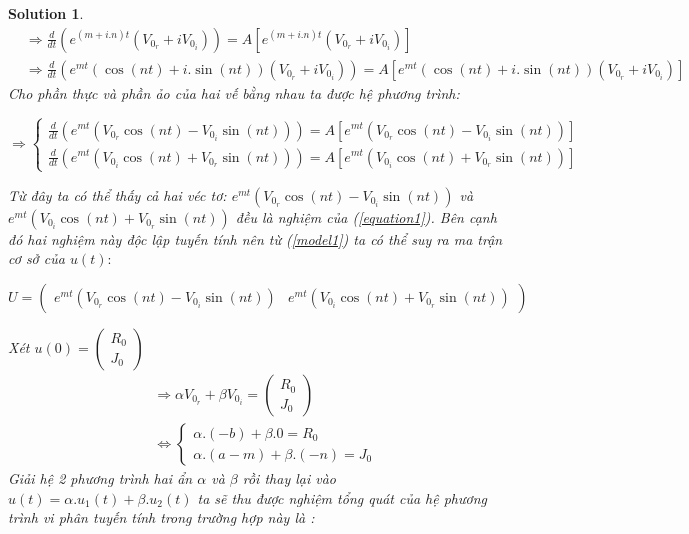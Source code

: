 \documentclass[a4paper]{article}
\newtheorem*{sol}{Solution}
\begin{document}
\begin{sol}
\begin{align*}
    &\Rightarrow \frac{d}{dt}(e^{(m+i.n)t}(V_{0_r}  + iV_{0_i} ))=A\left [e^{(m+i.n)t}(V_{0_r}  + iV_{0_i})\right]\\
&\Rightarrow \frac{d}{dt}(e^{mt}(\cos(nt)+i.\sin(nt))(V_{0_r}  + iV_{0_i} ))=A \left[ e^{mt}(\cos(nt)+i.\sin(nt))(V_{0_r}  + iV_{0_i} )\right ]
\end{align*}
Cho phần thực và phần ảo của hai vế bằng nhau ta được hệ phương trình:
\begin{center}
    $\Rightarrow \left\{\begin{matrix}
\frac{d}{dt}(e^{mt}(V_{0_r} \cos(nt)-V_{0_i} \sin(nt)))=A\left [e^{mt}(V_{0_r} \cos(nt)-V_{0_i} \sin(nt))\right ]\\ 
\frac{d}{dt}(e^{mt}(V_{0_i} \cos(nt)+V_{0_r} \sin(nt)))=A\left [e^{mt}(V_{0_i} \cos(nt)+V_{0_r} \sin(nt))\right ]
\end{matrix}\right.$
\end{center}
Từ đây ta có thể thấy cả hai véc tơ: $e^{mt}(V_{0_r} \cos(nt)-V_{0_i} \sin(nt))$ và $e^{mt}(V_{0_i} \cos(nt)+V_{0_r} \sin(nt))$ đều là nghiệm của (\ref{equation1}). Bên cạnh đó hai nghiệm này độc lập tuyến tính nên từ (\ref{model1}) ta có thể suy ra ma trận cơ sở của $u(t):$ \\
\begin{center}
    $U=\begin{pmatrix}
     e^{mt}(V_{0_r} \cos(nt)-V_{0_i} \sin(nt)) &  e^{mt}(V_{0_i} \cos(nt)+V_{0_r} \sin(nt))  
    \end{pmatrix}$
\end{center}
Xét $u(0)= \begin{pmatrix}
    R_0 \\ J_0
\end{pmatrix}$
\begin{align*}
    &\Rightarrow \alpha V_{0_r} + \beta V_{0_i} = \begin{pmatrix} R_0 \\ J_0 \end{pmatrix} \\
&\Leftrightarrow \left\{\begin{matrix}
\alpha. (-b)+ \beta.0=R_0\\ 
\alpha. (a-m) +\beta .(-n)=J_0
\end{matrix}\right.
\end{align*}
Giải hệ 2 phương trình hai ẩn $\alpha$ và $\beta$ rồi thay lại vào $u(t)=\alpha. u_1 (t)+ \beta .u_2 (t)$ ta sẽ thu được nghiệm tổng quát của hệ phương trình vi phân tuyến tính trong trường hợp này là : \\

\end{sol}
\end{document}
